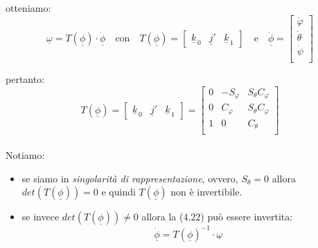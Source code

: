 otteniamo:
\begin{equation}
	\underline{\omega} = T(\underline{\phi}) \cdot \dot{\underline{\phi}} \quad \text{con} \quad T(\underline{\phi}) = 
	\begin{bmatrix}
		\underline{k}_{\,0} & \underline{j}' & \underline{k}_{\,1} 
	\end{bmatrix}
	\quad \text{e} \quad \dot{\underline{\phi}} = 
	\begin{bmatrix}
		\dot{\varphi} \\
		\dot{\theta} \\
		\dot{\psi} \\
	\end{bmatrix}
\end{equation}

pertanto:
\begin{equation}
	T(\underline{\phi}) = 
	\begin{bmatrix}
		\underline{k}_{\,0} & \underline{j}' & \underline{k}_{\,1} 
	\end{bmatrix} = 
	\begin{bmatrix}
		0 & -S_{\varphi} & S_{\theta}C_{\varphi} \\
		0 & C_{\varphi} & S_{\theta}C_{\varphi} \\
		1 & 0 & C_{\theta} \\
	\end{bmatrix}
\end{equation}
\paragraph{}
Notiamo:
\begin{itemize}
	\item se siamo in \emph{singolarità di rappresentazione}, ovvero, $S_{\theta} = 0$ allora\\ 
	$det(T(\underline{\phi})) = 0$ e quindi $T(\underline{\phi})$ non è invertibile.
	\item se invece $det(T(\underline{\phi})) \neq 0$ allora la ($4.22$) può essere invertita: \begin{equation}
		\underline{\dot{\phi}} = T(\underline{\phi})^{-1} \cdot \underline{\omega}
	\end{equation}
\end{itemize}
